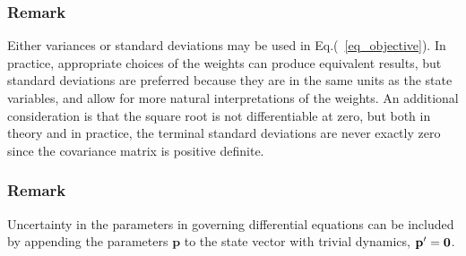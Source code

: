 \documentclass[journal ]{new-aiaa}
\newcommand{\state}{\ensuremath{\mathbf{x}}}
\newcommand{\ur}{\ensuremath{u_{\mathrm{ref}}}}
\newcommand{\param}{\ensuremath{\mathbf{p}}}
\newcommand{\E}[1]{\mathbb{E}\left[#1\right]}
\newcommand{\V}[1]{\mathbb{V}[#1]}
\newcommand{\cov}{C}
\begin{document}
\subsubsection*{Remark} Either variances or standard deviations may be used in Eq.(~\ref{eq_objective}). In practice, appropriate choices of the weights can produce equivalent results, but standard deviations are preferred because they are in the same units as the state variables, and allow for more natural interpretations of the weights. An additional consideration is that the square root is not differentiable at zero, but both in theory and in practice, the terminal standard deviations are never exactly zero since the covariance matrix is positive definite.
\subsubsection*{Remark} Uncertainty in the parameters in governing differential equations can be included by appending the parameters $\param$ to the state vector with trivial dynamics, $\param'=\bf0$.

\end{document}
